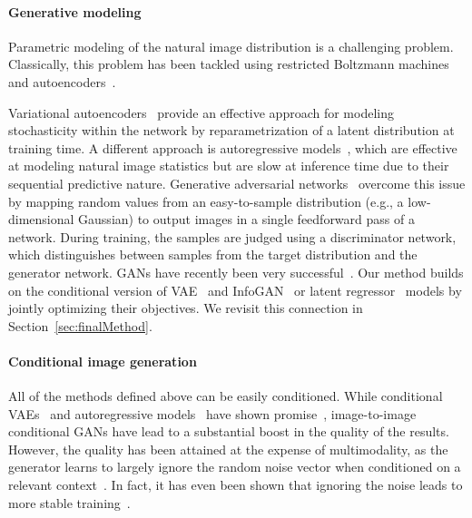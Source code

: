 \paragraph{Generative modeling} Parametric modeling of the natural image distribution is a challenging problem. Classically, this problem has been tackled using restricted Boltzmann machines~\citep{smolensky1986information} and autoencoders~\citep{hinton2006reducing,vincent2008extracting}. 

Variational autoencoders~\citep{kingma2013auto} provide an effective approach for modeling stochasticity within the network by reparametrization of a latent distribution at training time. A different approach is autoregressive models~\citep{efros1999texture,van2016pixel,oord2016conditional}, which are effective at modeling natural image statistics but are slow at inference time due to their sequential predictive nature. Generative adversarial networks~\citep{goodfellow2014generative} overcome this issue by mapping random values from an easy-to-sample distribution (e.g., a low-dimensional Gaussian) to output images in a single feedforward pass of a network. During training, the samples are judged using a discriminator network, which distinguishes between samples from the target distribution and the generator network. GANs have recently been very successful~\citep{denton2015deep,radford2015unsupervised,donahue2016adversarial,dumoulin2016adversarially,reed2016generative,zhao2016energy,zhu2016generative,arjovsky2017wgan,zhang2016stackgan,xi2016infogan}. Our method builds on the conditional version of VAE~\citep{kingma2013auto} and InfoGAN~\citep{xi2016infogan} or latent regressor~\citep{donahue2016adversarial,dumoulin2016adversarially} models by jointly optimizing their objectives. We revisit this connection in Section~\ref{sec:finalMethod}.

\paragraph{Conditional image generation} All of the methods defined above can be easily conditioned. While conditional VAEs~\citep{sohn2015cvae} and autoregressive models~\citep{oord2016conditional,van2016pixel} have shown promise~\citep{walker2016uncertain,xue2016visual,guadarrama2017pixcolor}, image-to-image conditional GANs have lead to a substantial boost in the quality of the results. However, the quality has been attained at the expense of multimodality, as the generator learns to largely ignore the random noise vector when conditioned on a relevant context~\citep{pathakCVPR16context,sangkloy2017scribbler,xian2017texturegan,yang2016high,isola2016image,zhu2017unpaired}. In fact, it has even been shown that ignoring the noise leads to more stable training~\citep{mathieu2015deep,pathakCVPR16context,isola2016image}.

